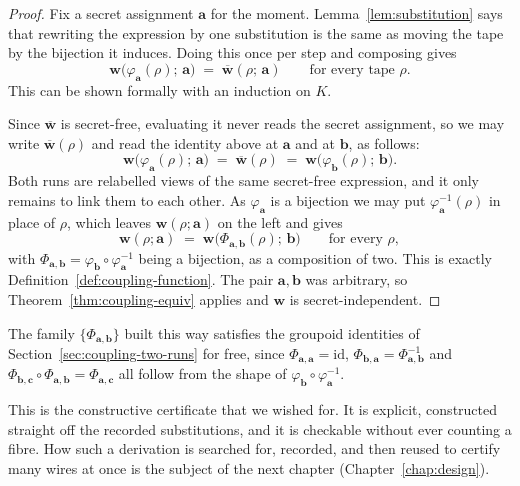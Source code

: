   \begin{proof}
  Fix a secret assignment $\mathbf{a}$ for the moment. Lemma~\ref{lem:substitution}
  says that rewriting the expression by one substitution is the same as moving the
  tape by the bijection it induces. Doing this once per step and composing gives
  \[
    \mathbf{w}\big(\varphi_{\mathbf{a}}(\rho);\, \mathbf{a}\big)
      \;=\; \overline{\mathbf{w}}(\rho;\, \mathbf{a})
    \qquad \text{for every tape } \rho .
  \]
  This can be shown formally with an induction on $K$.

  Since $\overline{\mathbf{w}}$ is secret-free, evaluating
  it never reads the secret assignment, so we may write $\overline{\mathbf{w}}(\rho)$
  and read the identity above at $\mathbf{a}$ and at $\mathbf{b}$, as follows:
  \[
    \mathbf{w}\big(\varphi_{\mathbf{a}}(\rho);\, \mathbf{a}\big)
      \;=\; \overline{\mathbf{w}}(\rho) \;=\;
    \mathbf{w}\big(\varphi_{\mathbf{b}}(\rho);\, \mathbf{b}\big) .
  \]
  Both runs are relabelled views of the same secret-free expression, and it only
  remains to link them to each other. As $\varphi_{\mathbf{a}}$ is a bijection we may
  put $\varphi_{\mathbf{a}}^{-1}(\rho)$ in place of $\rho$, which leaves
  $\mathbf{w}(\rho; \mathbf{a})$ on the left and gives
  \[
    \mathbf{w}(\rho; \mathbf{a}) \;=\;
    \mathbf{w}\big(\Phi_{\mathbf{a},\mathbf{b}}(\rho);\, \mathbf{b}\big)
    \qquad \text{for every } \rho ,
  \]
  with $\Phi_{\mathbf{a},\mathbf{b}} = \varphi_{\mathbf{b}} \circ
  \varphi_{\mathbf{a}}^{-1}$ being a bijection, as a composition of two. This is
  exactly Definition~\ref{def:coupling-function}. The pair $\mathbf{a}, \mathbf{b}$
  was arbitrary, so Theorem~\ref{thm:coupling-equiv} applies and $\mathbf{w}$ is
  secret-independent.
  \end{proof}

  The family $\{\Phi_{\mathbf{a},\mathbf{b}}\}$ built this way satisfies the
  groupoid identities of Section~\ref{sec:coupling-two-runs} for free, since
  $\Phi_{\mathbf{a},\mathbf{a}} = \mathrm{id}$,
  $\Phi_{\mathbf{b},\mathbf{a}} = \Phi_{\mathbf{a},\mathbf{b}}^{-1}$ and
  $\Phi_{\mathbf{b},\mathbf{c}} \circ \Phi_{\mathbf{a},\mathbf{b}} =
  \Phi_{\mathbf{a},\mathbf{c}}$ all follow from the shape of
  $\varphi_{\mathbf{b}} \circ \varphi_{\mathbf{a}}^{-1}$.

  This is the constructive certificate that we wished for.
  It is explicit, constructed straight off the recorded
  substitutions, and it is checkable without ever counting a fibre.
  How such a derivation is searched for, recorded,
  and then reused to certify many wires at once is the subject of
  the next chapter (Chapter~\ref{chap:design}).
